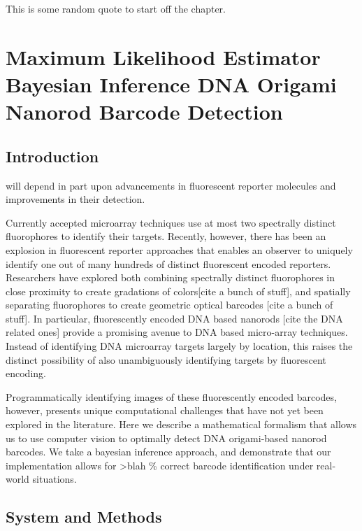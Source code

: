 %

\begin{savequote}[75mm] 
This is some random quote to start off the chapter.
\end{savequote}

\chapter{Maximum Likelihood Estimator Bayesian Inference DNA Origami  Nanorod Barcode Detection} \label{chapter:DNAtheory}

\section{Introduction}
 will depend in part upon advancements in fluorescent reporter molecules and improvements in their detection.

Currently accepted microarray techniques  use at most two spectrally distinct fluorophores to identify their targets.  Recently, however, there has been an explosion in fluorescent reporter approaches that enables an observer to uniquely identify one out of many hundreds of distinct fluorescent encoded reporters. Researchers have explored both combining spectrally distinct fluorophores in close proximity to create gradations of colors[cite a bunch of stuff], and spatially separating fluorophores to create geometric optical barcodes [cite a bunch of stuff]. In particular, fluorescently encoded DNA based nanorods [cite the DNA related ones] provide a promising avenue to DNA based micro-array techniques. Instead of identifying DNA microarray targets largely by location, this raises the distinct possibility of also unambiguously identifying targets by fluorescent encoding. 

Programmatically identifying images of these fluorescently encoded barcodes, however, presents unique computational challenges that have not yet been explored in the literature.  Here we describe a mathematical formalism that allows us to use computer vision to optimally detect DNA origami-based nanorod barcodes. We take a bayesian inference approach, and demonstrate that our implementation allows for >blah \% correct barcode identification under real-world situations. 

\section{System and Methods}

